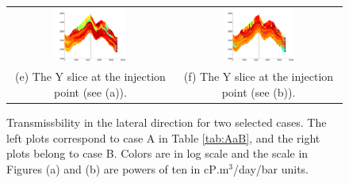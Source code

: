 \begin{figure}
\begin{tabular}{cc}
\includegraphics[width=0.45\textwidth]{./figurer/C02222_LogKy_slcy}&
\includegraphics[width=0.45\textwidth]{./figurer/C03211_LogKy_slcy}
\\(e) The Y slice at the injection point (see (a)).&
(f) The Y slice at the injection point (see (b)).
\end{tabular}
\caption{Transmissbility in the lateral direction for two selected cases. The left plots correspond to case A in Table \ref{tab:AaB}, and the right plots belong to case B. Colors are in log scale and the scale in Figures (a) and (b) are powers of ten in cP$.$m$^3$/day/bar units.}
\label{fig:Ky}
\end{figure}

